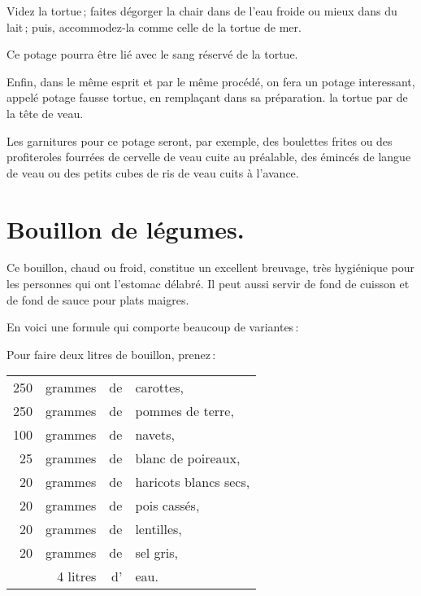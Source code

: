 Videz la tortue ; faites dégorger la chair dans de l’eau froide ou mieux dans
du lait ; puis, accommodez-la comme celle de la tortue de mer.

Ce potage pourra être lié avec le sang réservé de la tortue.

\sk

Enfin, dans le même esprit et par le même procédé, on fera un potage
interessant, appelé potage fausse tortue, en remplaçant dans sa préparation. la
tortue par de la tête de veau.

Les garnitures pour ce potage seront, par exemple, des boulettes frites ou des
profiteroles fourrées de cervelle de veau cuite au préalable, des émincés de
langue de veau ou des petits cubes de ris de veau cuits à l'avance.

\section*{\centering Bouillon de légumes.}
\label{pg0211} \hypertarget{p0211}{}

Ce bouillon, chaud ou froid, constitue un excellent breuvage, très hygiénique
pour les personnes qui ont l'estomac délabré. Il peut aussi servir de fond de
cuisson et de fond de sauce pour plats maigres.

\medskip

En voici une formule qui comporte beaucoup de variantes :

\medskip

Pour faire deux litres de bouillon, prenez :

\medskip

\footnotesize
\begin{longtable}{rrrp{16em}}
   250 & grammes  & de & carottes,                                                                        \\
   250 & grammes  & de & pommes de terre,                                                                 \\
   100 & grammes  & de & navets,                                                                          \\
    25 & grammes  & de & blanc de poireaux,                                                               \\
    20 & grammes  & de & haricots blancs secs,                                                            \\
    20 & grammes  & de & pois cassés,                                                                     \\
    20 & grammes  & de & lentilles,                                                                       \\
    20 & grammes  & de & sel gris,                                                                        \\
       & 4 litres & d' & eau.                                                                             \\
\end{longtable}
\normalsize                   

